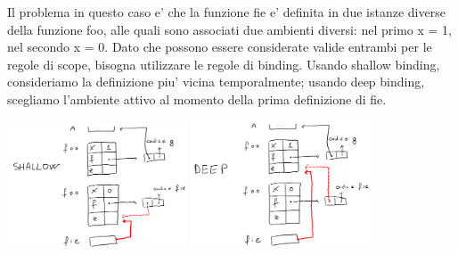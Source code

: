 Il problema in questo caso e' che la funzione fie e' definita in due istanze diverse della funzione foo, alle quali sono associati due ambienti diversi: nel primo x = 1, nel secondo x = 0. Dato che possono essere considerate valide entrambi per le regole di scope, bisogna utilizzare le regole di binding. Usando shallow binding, consideriamo la definizione piu' vicina temporalmente; usando deep binding, scegliamo l'ambiente attivo al momento della prima definizione di fie.

\begin{center}
  \includegraphics[width=0.4\textwidth]{img/2025-03-21-20-41-11.png}
  \includegraphics[width=0.4\textwidth]{img/2025-03-21-20-42-39.png}
\end{center}

% 
